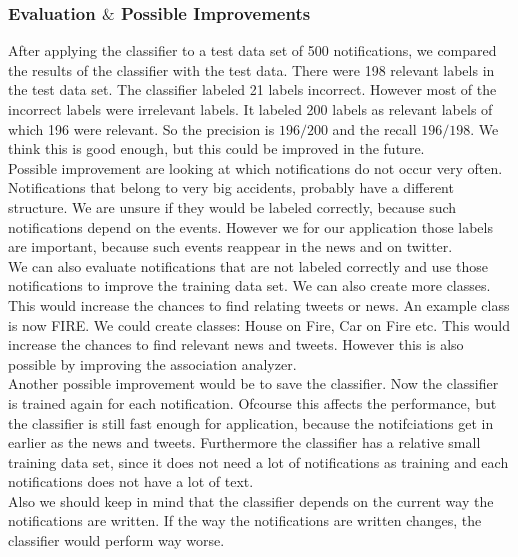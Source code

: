 \subsubsection*{Evaluation $\&$ Possible Improvements }
After applying the classifier to a test data set of 500 notifications, we compared the results of the classifier with the test data. 
There were 198 relevant labels in the test data set. The classifier labeled 21 labels incorrect. 
However most of the incorrect labels were irrelevant labels. 
It labeled 200 labels as relevant labels of which 196 were relevant. 
So the precision is $196/200$ and the recall $196/198$. 
We think this is good enough, but this could be improved in the future. \\
Possible improvement are looking at which notifications do not occur very often. 
Notifications that belong to very big accidents, probably have a different structure. 
We are unsure if they would be labeled correctly, because such notifications depend on the events. 
However we for our application those labels are important, because such events reappear in the news and on twitter. \\
We can also evaluate notifications that are not labeled correctly and use those notifications to improve the training data set. 
We can also create more classes. This would increase the chances to find relating tweets or news. An example class is now FIRE.
 We could create classes: House on Fire, Car on Fire etc. This would increase the chances to find relevant news and tweets. However this is also possible by improving the association analyzer. \\
 Another possible improvement would be to save the classifier. Now the classifier is trained again for each notification. 
 Ofcourse this affects the performance, but the classifier is still fast enough for application, because the notifciations get in earlier as the news and tweets. 
 Furthermore the classifier has a relative small training data set, since it does not need a lot of notifications as training and each notifications does not have a lot of text.\\
Also we should keep in mind that the classifier depends on the current way the notifications are written. 
If the way the notifications are written changes, the classifier would perform way worse.